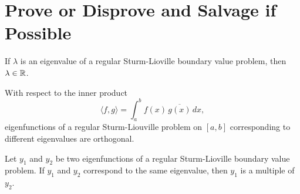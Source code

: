 \documentclass{homework}
\begin{document}
\section{Prove or Disprove and Salvage if Possible}

\begin{problem}
  If $\lambda$ is an eigenvalue of a regular Sturm-Lioville boundary
  value problem, then $\lambda \in \mathbb{R}$.
\end{problem}

\begin{problem}
  With respect to the inner product
    \[ %
      \langle f, g \rangle = \displaystyle\int_a^b f(x) \, \overline{g(x)} \, dx,
    \]
    eigenfunctions of a regular Sturm-Liouville problem on $[a,b]$
    corresponding to different eigenvalues are orthogonal.
\end{problem}

\begin{problem}
  Let $y_1$ and $y_2$ be two eigenfunctions of a regular
  Sturm-Lioville boundary value problem.  If $y_1$ and $y_2$
  correspond to the same eigenvalue, then $y_1$ is a multiple of
  $y_2$.
\end{problem}
\end{document}
